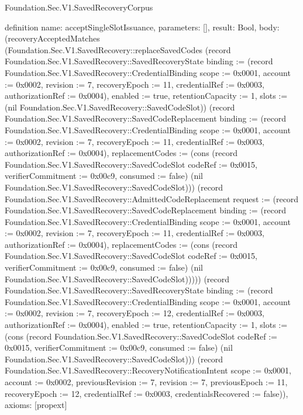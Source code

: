 \begin{lexlean}{Foundation.Sec.V1.SavedRecoveryCorpus}
\begin{semanticmodule}
definition{
  name: acceptSingleSlotIssuance,
  parameters: [],
  result: Bool,
  body: (recoveryAcceptedMatches (Foundation.Sec.V1.SavedRecovery::replaceSavedCodes (record Foundation.Sec.V1.SavedRecovery::SavedRecoveryState {binding := (record Foundation.Sec.V1.SavedRecovery::CredentialBinding {scope := 0x0001, account := 0x0002, revision := 7, recoveryEpoch := 11, credentialRef := 0x0003, authorizationRef := 0x0004}), enabled := true, retentionCapacity := 1, slots := (nil Foundation.Sec.V1.SavedRecovery::SavedCodeSlot)}) (record Foundation.Sec.V1.SavedRecovery::SavedCodeReplacement {binding := (record Foundation.Sec.V1.SavedRecovery::CredentialBinding {scope := 0x0001, account := 0x0002, revision := 7, recoveryEpoch := 11, credentialRef := 0x0003, authorizationRef := 0x0004}), replacementCodes := (cons (record Foundation.Sec.V1.SavedRecovery::SavedCodeSlot {codeRef := 0x0015, verifierCommitment := 0x00c9, consumed := false}) (nil Foundation.Sec.V1.SavedRecovery::SavedCodeSlot))}) (record Foundation.Sec.V1.SavedRecovery::AdmittedCodeReplacement {request := (record Foundation.Sec.V1.SavedRecovery::SavedCodeReplacement {binding := (record Foundation.Sec.V1.SavedRecovery::CredentialBinding {scope := 0x0001, account := 0x0002, revision := 7, recoveryEpoch := 11, credentialRef := 0x0003, authorizationRef := 0x0004}), replacementCodes := (cons (record Foundation.Sec.V1.SavedRecovery::SavedCodeSlot {codeRef := 0x0015, verifierCommitment := 0x00c9, consumed := false}) (nil Foundation.Sec.V1.SavedRecovery::SavedCodeSlot))})})) (record Foundation.Sec.V1.SavedRecovery::SavedRecoveryState {binding := (record Foundation.Sec.V1.SavedRecovery::CredentialBinding {scope := 0x0001, account := 0x0002, revision := 7, recoveryEpoch := 12, credentialRef := 0x0003, authorizationRef := 0x0004}), enabled := true, retentionCapacity := 1, slots := (cons (record Foundation.Sec.V1.SavedRecovery::SavedCodeSlot {codeRef := 0x0015, verifierCommitment := 0x00c9, consumed := false}) (nil Foundation.Sec.V1.SavedRecovery::SavedCodeSlot))}) (record Foundation.Sec.V1.SavedRecovery::RecoveryNotificationIntent {scope := 0x0001, account := 0x0002, previousRevision := 7, revision := 7, previousEpoch := 11, recoveryEpoch := 12, credentialRef := 0x0003, credentialsRecovered := false})),
  axioms: [propext]
}
\end{semanticmodule}
\end{lexlean}
